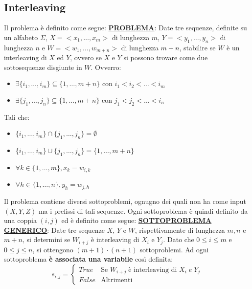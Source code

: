 \documentclass[12pt]{article}
\begin{document}
\subsection{Interleaving}
Il problema è definito come segue: \newline
\textbf{\underline{PROBLEMA}}: Date tre sequenze, definite su un alfabeto $\Sigma$, $X = <x_1,\dots,x_m>$ di lunghezza $m$, $Y = <y_1, \dots, y_n>$ di lunghezza $n$ e $W = <w_1, \dots, w_{m+n}>$ di lunghezza $m+n$, stabilire
se $W$ è un interleaving di $X$ ed $Y$, ovvero se $X$ e $Y$ si possono trovare come due sottosequenze disgiunte in $W$. Ovverro:
\begin{itemize}
    \item $\exists \{i_1, \dots, i_m\} \subseteq \{1, \dots, m+n\}$ con $i_1 < i_2 < \dots < i_m$
    \item $\exists \{j_1, \dots, j_n\} \subseteq \{1, \dots, m+n\}$ con $j_1 < j_2 < \dots < i_n$
\end{itemize}
Tali che:
\begin{itemize}
    \item $\{i_1, \dots, i_m\} \cap \{j_1, \dots, j_n\} = \emptyset$
    \item $\{i_1, \dots, i_m\} \cup \{j_1, \dots, j_n\} = \{1, \dots, m+n\}$
    \item $\forall k \in \{1,\dots, m\}, x_k = w_{i,k}$
    \item $\forall h \in \{1, \dots, n\}, y_h = w_{j,h}$ 
\end{itemize}
Il problema contiene diversi sottoproblemi, ognugno dei quali non ha come input $(X,Y,Z)$ ma i prefissi di tali sequenze.
Ogni sottoproblema è quindi definito da una coppia $(i,j)$ ed è definito come segue: \newline
\textbf{\underline{SOTTOPROBLEMA GENERICO}}: Date tre sequenze $X$, $Y$ e $W$, rispettivamente di lunghezza $m, n$ e $m+n$, si determini se $W_{i+j}$ è interleaving di $X_i$ e $Y_j$. \newline
Dato che $0 \leq i \leq m$ e $0 \leq j \leq n$, si ottengono $(m+1) \cdot (n+1)$ sottoproblemi.
Ad ogni sottoproblema \textbf{è associata una variabile} così definita:
\begin{equation*}
    s_{i,j} = \begin{cases}
        True & \textrm{Se } W_{i+j} \; \textrm{è interleaving di } X_i \; e \; Y_j \\
        False & \textrm{Altrimenti}
    \end{cases}
\end{equation*}
\end{document}
